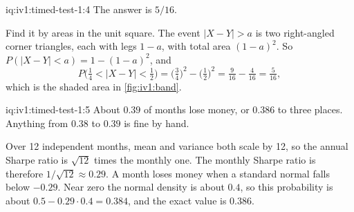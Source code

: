 \begin{solution}{iq:iv1:timed-test-1:4}
The answer is $5/16$.

Find it by areas in the unit square. The event $|X - Y| > a$ is two right-angled corner triangles, each with legs $1 - a$, with total area $(1 - a)^2$. So $P(|X - Y| < a) = 1 - (1 - a)^2$, and
\[
P\bigl(\tfrac14 < |X - Y| < \tfrac12\bigr) = \bigl(\tfrac34\bigr)^2 - \bigl(\tfrac12\bigr)^2 = \tfrac{9}{16} - \tfrac{4}{16} = \tfrac{5}{16} ,
\]
which is the shaded area in \cref{fig:iv1:band}.

\begin{omfigure}

\label{fig:iv1:band}
\end{omfigure}
\end{solution}

\begin{solution}{iq:iv1:timed-test-1:5}
About $0.39$ of months lose money, or $0.386$ to three places. Anything from $0.38$ to $0.39$ is fine by hand.

Over 12 independent months, mean and variance both scale by 12, so the annual Sharpe ratio is $\sqrt{12}$ times the monthly one. The monthly Sharpe ratio is therefore $1/\sqrt{12} \approx 0.29$. A month loses money when a standard normal falls below $-0.29$. Near zero the normal density is about $0.4$, so this probability is about $0.5 - 0.29 \cdot 0.4 = 0.384$, and the exact value is $0.386$.

\end{solution}

